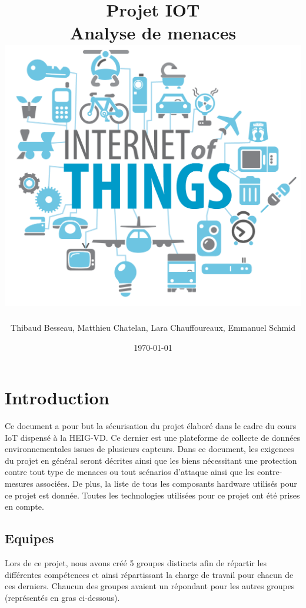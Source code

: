 \documentclass[12pt]{article}
\title{
  \vspace{-0.5cm}
  \huge{Projet IOT} \\
  \vspace{5mm}
  \Large{Analyse de menaces} \\
  \vspace{2.5cm}
  \includegraphics[width=.7\textwidth]{logo}
  \vspace{3cm}
}
\author{Thibaud Besseau, Matthieu Chatelan, Lara Chauffoureaux, Emmanuel Schmid}
\date{\today}
\begin{document}
\maketitle
\thispagestyle{empty}
\clearpage
\tableofcontents
\clearpage
\listoffigures
\clearpage
\headsep=20pt

\section{Introduction}
Ce document a pour but la sécurisation du projet élaboré dans le cadre du cours IoT dispensé à la HEIG-VD. Ce dernier est une plateforme de collecte de données environnementales issues de plusieurs capteurs. Dans ce document, les exigences du projet en général seront décrites ainsi que les biens nécessitant une protection contre tout type de menaces ou tout scénarios d'attaque ainsi que les contre-mesures associées. De plus, la liste de tous les composants hardware utilisés pour ce projet est donnée. Toutes les technologies utilisées pour ce projet ont été prises en compte.

\subsection{Equipes}
Lors de ce projet, nous avons créé 5 groupes distincts afin de répartir les différentes compétences et ainsi répartissant la charge de travail pour chacun de ces derniers. Chaucun des groupes avaient un répondant pour les autres groupes (représentés en gras ci-dessous).
\end{document}
